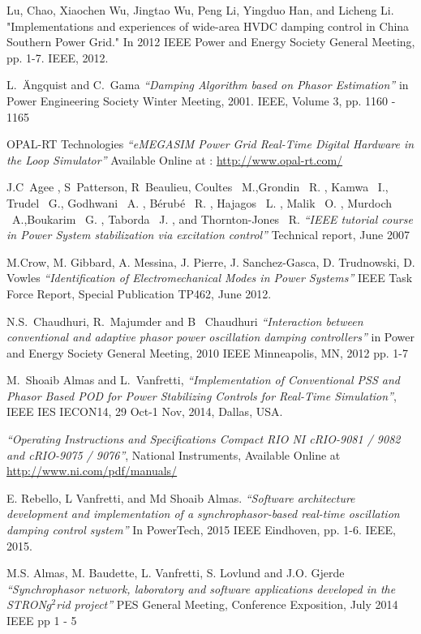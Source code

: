 \documentclass{ieeeaccess}
\begin{document}
\begin{thebibliography}{00}
 Lu, Chao, Xiaochen Wu, Jingtao Wu, Peng Li, Yingduo Han, and Licheng Li. "Implementations and experiences of wide-area HVDC damping control in China Southern Power Grid." In 2012 IEEE Power and Energy Society General Meeting, pp. 1-7. IEEE, 2012.

L.~\"{A}ngquist and C.~Gama  \emph{``Damping Algorithm based on Phasor Estimation''} in Power Engineering Society Winter Meeting, 2001. IEEE, Volume 3, pp. 1160 - 1165  

OPAL-RT Technologies \emph{``eMEGASIM Power Grid Real-Time Digital Hardware in the Loop Simulator''} Available Online at : \underline{http://www.opal-rt.com/}

 J.C~Agee , S~Patterson, R~Beaulieu, Coultes \ M.,Grondin \ R. , Kamwa \ I.,
Trudel \ G., Godhwani \ A. , Bérubé \ R. , Hajagos \ L. , Malik \ O. , Murdoch \ A.,Boukarim \ G. , Taborda \ J. , and Thornton-Jones \ R. \emph{``IEEE tutorial course in Power System stabilization via excitation control''} Technical report, June 2007


 M.Crow, M. Gibbard, A. Messina, J. Pierre, J. Sanchez-Gasca, D. Trudnowski, D. Vowles \emph{``Identification of Electromechanical Modes in Power Systems''} IEEE Task Force Report, Special Publication TP462, June 2012.

 N.S.~Chaudhuri, R.~Majumder and B~ Chaudhuri \emph{``Interaction between conventional and adaptive phasor power oscillation damping controllers''} in Power and Energy Society General Meeting, 2010 IEEE Minneapolis, MN, 2012 pp. 1-7
  
 M.~Shoaib Almas and L.~Vanfretti, \emph{``Implementation of Conventional PSS and Phasor Based POD for Power Stabilizing Controls for Real-Time Simulation''}, IEEE IES IECON14, 29 Oct-1 Nov, 2014, Dallas, USA.

 \emph{``Operating Instructions and Specifications Compact RIO NI cRIO-9081 / 9082 and cRIO-9075 / 9076''}, National Instruments, Available Online at \underline{http://www.ni.com/pdf/manuals/}

E. Rebello, L Vanfretti, and Md Shoaib Almas. \emph{``Software architecture development and implementation of a synchrophasor-based real-time oscillation damping control system''} In PowerTech, 2015 IEEE Eindhoven, pp. 1-6. IEEE, 2015.

 M.S. Almas, M. Baudette, L. Vanfretti, S. Lovlund and J.O. Gjerde \emph{``Synchrophasor network, laboratory and software applications developed in the STRON$g^{2}$rid project''} PES General Meeting, Conference Exposition, July 2014 IEEE pp 1 - 5


\end{thebibliography}
\end{document}
